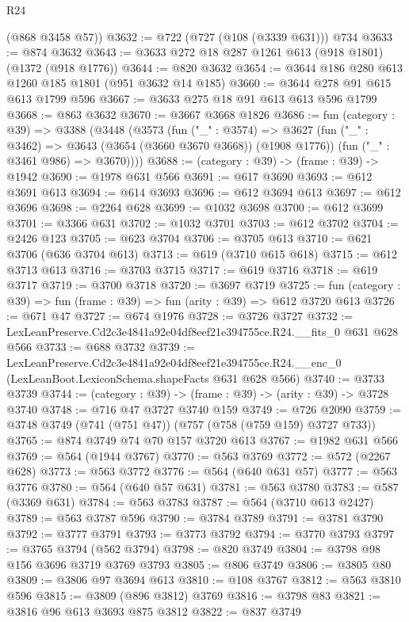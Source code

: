 \begin{lexlean}{R24}
\begin{coremodule}
      (@868 @3458 @57))
@3632 := @722 (@727 (@108 (@3339 @631))) @734
@3633 := @874 @3632
@3643 := @3633 @272 @18 @287 @1261 @613 (@918 @1801) (@1372 (@918 @1776))
@3644 := @820 @3632
@3654 := @3644 @186 @280 @613 @1260 @185 @1801 (@951 @3632 @14 @185)
@3660 := @3644 @278 @91 @615 @613 @1799 @596
@3667 := @3633 @275 @18 @91 @613 @613 @596 @1799
@3668 := @863 @3632
@3670 := @3667 @3668 @1826
@3686 := fun (category : @39) =>
  @3388
    (@3448
      (@3573
        (fun ("_" : @3574) =>
        @3627
          (fun ("_" : @3462) => @3643 (@3654 (@3660 @3670 @3668)) (@1908 @1776))
          (fun ("_" : @3461 @986) => @3670))))
@3688 := (category : @39) -> (frame : @39) -> @1942
@3690 := @1978 @631 @566
@3691 := @617 @3690
@3693 := @612 @3691 @613
@3694 := @614 @3693
@3696 := @612 @3694 @613
@3697 := @612 @3696
@3698 := @2264 @628
@3699 := @1032 @3698
@3700 := @612 @3699
@3701 := @3366 @631
@3702 := @1032 @3701
@3703 := @612 @3702
@3704 := @2426 @123
@3705 := @623 @3704
@3706 := @3705 @613
@3710 := @621 @3706 (@636 @3704 @613)
@3713 := @619 (@3710 @615 @618)
@3715 := @612 @3713 @613
@3716 := @3703 @3715
@3717 := @619 @3716
@3718 := @619 @3717
@3719 := @3700 @3718
@3720 := @3697 @3719
@3725 := fun (category : @39) => fun (frame : @39) => fun (arity : @39) => @612 @3720 @613
@3726 := @671 @47
@3727 := @674 @1976
@3728 := @3726 @3727
@3732 := LexLeanPreserve.Cd2c3e4841a92e04df8eef21e394755ce.R24.__fits_0 @631 @628 @566
@3733 := @688 @3732
@3739 := LexLeanPreserve.Cd2c3e4841a92e04df8eef21e394755ce.R24.__enc_0
    (LexLeanBoot.LexiconSchema.shapeFacts @631 @628 @566)
@3740 := @3733 @3739
@3744 := (category : @39) -> (frame : @39) -> (arity : @39) -> @3728 @3740
@3748 := @716 @47 @3727 @3740 @159
@3749 := @726 @2090
@3759 := @3748 @3749 (@741 (@751 @47)) (@757 (@758 (@759 @159) @3727 @733))
@3765 := @874 @3749 @74 @70 @157 @3720 @613
@3767 := @1982 @631 @566
@3769 := @564 (@1944 @3767)
@3770 := @563 @3769
@3772 := @572 (@2267 @628)
@3773 := @563 @3772
@3776 := @564 (@640 @631 @57)
@3777 := @563 @3776
@3780 := @564 (@640 @57 @631)
@3781 := @563 @3780
@3783 := @587 (@3369 @631)
@3784 := @563 @3783
@3787 := @564 (@3710 @613 @2427)
@3789 := @563 @3787 @596
@3790 := @3784 @3789
@3791 := @3781 @3790
@3792 := @3777 @3791
@3793 := @3773 @3792
@3794 := @3770 @3793
@3797 := @3765 @3794 (@562 @3794)
@3798 := @820 @3749
@3804 := @3798 @98 @156 @3696 @3719 @3769 @3793
@3805 := @806 @3749
@3806 := @3805 @80
@3809 := @3806 @97 @3694 @613
@3810 := @108 @3767
@3812 := @563 @3810 @596
@3815 := @3809 (@896 @3812) @3769
@3816 := @3798 @83
@3821 := @3816 @96 @613 @3693 @875 @3812
@3822 := @837 @3749

\end{coremodule}
\end{lexlean}
